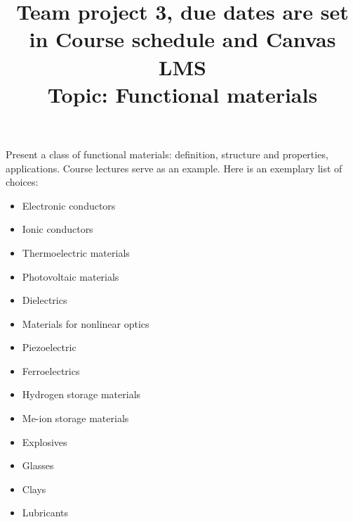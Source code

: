 \documentclass[11pt]{Project}
\begin{document}
\title{Team project 3, due dates are set in Course schedule and Canvas LMS \\ Topic: Functional materials}
\maketitle

Present a class of functional materials: definition, structure and properties, applications. Course lectures serve as an example. Here is an exemplary list of choices:

\begin{itemize}
\item Electronic conductors
\item Ionic conductors
\item Thermoelectric materials
\item Photovoltaic materials
\item Dielectrics
\item Materials for nonlinear optics
\item Piezoelectric
\item Ferroelectrics
\item Hydrogen storage materials
\item Me-ion storage materials 
\item Explosives
\item Glasses
\item Clays
\item Lubricants
\end{itemize}

\reminder{}
\end{document}
